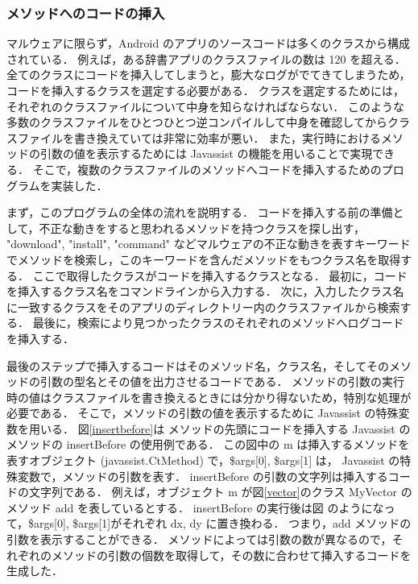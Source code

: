 \subsubsection{メソッドへのコードの挿入}
\label{insertcodes}
マルウェアに限らず，Android のアプリのソースコードは多くのクラスから構成されている．
例えば，ある辞書アプリのクラスファイルの数は 120 を超える．
全てのクラスにコードを挿入してしまうと，膨大なログがでてきてしまうため，コードを挿入するクラスを選定する必要がある．
クラスを選定するためには，それぞれのクラスファイルについて中身を知らなければならない．
このような多数のクラスファイルをひとつひとつ逆コンパイルして中身を確認してからクラスファイルを書き換えていては非常に効率が悪い．
また，実行時におけるメソッドの引数の値を表示するためには Javassist の機能を用いることで実現できる．
そこで，複数のクラスファイルのメソッドへコードを挿入するためのプログラムを実装した．

まず，このプログラムの全体の流れを説明する．
コードを挿入する前の準備として，不正な動きをすると思われるメソッドを持つクラスを探し出す，
"download", "install", "command" などマルウェアの不正な動きを表すキーワードでメソッドを検索し，このキーワードを含んだメソッドをもつクラス名を取得する．
ここで取得したクラスがコードを挿入するクラスとなる．
最初に，コードを挿入するクラス名をコマンドラインから入力する．
次に，入力したクラス名に一致するクラスをそのアプリのディレクトリー内のクラスファイルから検索する．
最後に，検索により見つかったクラスのそれぞれのメソッドへログコードを挿入する．

最後のステップで挿入するコードはそのメソッド名，クラス名，そしてそのメソッドの引数の型名とその値を出力させるコードである．
メソッドの引数の実行時の値はクラスファイルを書き換えるときには分かり得ないため，特別な処理が必要である．
そこで，メソッドの引数の値を表示するために Javassist の特殊変数を用いる．
図\ref{insertbefore}は メソッドの先頭にコードを挿入する Javassist のメソッドの insertBefore の使用例である．
この図中の m は挿入するメソッドを表すオブジェクト (javassist.CtMethod) で，\$args[0], \$args[1] は， Javassist の特殊変数で，メソッドの引数を表す．
insertBefore の引数の文字列は挿入するコードの文字列である．
例えば，オブジェクト m が図\ref{vector}のクラス MyVector のメソッド add を表しているとする．
insertBefore の実行後は図 のようになって，\$args[0], \$args[1]がそれぞれ dx, dy に置き換わる．
つまり，add メソッドの引数を表示することができる．
メソッドによっては引数の数が異なるので，それぞれのメソッドの引数の個数を取得して，その数に合わせて挿入するコードを生成した．

